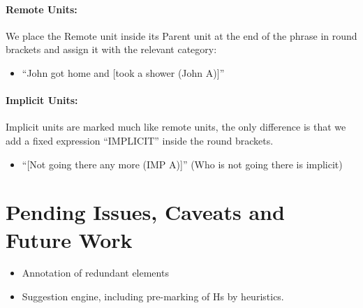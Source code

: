 \documentclass[11pt]{article}
\newcommand{\orig}[1]{{\color{red} {#1}}}
\begin{document}
\paragraph{Remote Units:}
We place the Remote unit inside its Parent unit at the end of the phrase in round brackets and assign it with the relevant category:
\begin{itemize}
\item
``John got home and [took a shower (John A)]''
\end{itemize}

\paragraph{Implicit Units:}
Implicit units are marked much like remote units, the only difference is that we add a fixed expression ``IMPLICIT'' inside the round brackets. 
\begin{itemize}
\item
``[Not going there any more (IMP A)]'' (Who is not going there is implicit)
\end{itemize}


\section{Pending Issues, Caveats and Future Work}




\begin{itemize}
   \item Annotation of redundant elements
   \item Suggestion engine, including pre-marking of Hs by heuristics.
\end{itemize}
\end{document}
